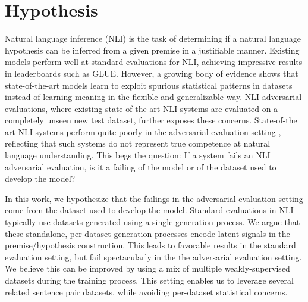 \section{Hypothesis}
\label{sec:hypothesis}


Natural language inference (NLI) is the task of determining if a natural language hypothesis can be inferred from a given premise in a justifiable manner. Existing models perform well at standard evaluations for NLI, achieving impressive results in leaderboards such as GLUE. However, a growing body of evidence \cite{mccoy2019right, glockner2018breaking} shows that state-of-the-art models learn to exploit spurious statistical patterns in datasets instead of learning meaning in the flexible and generalizable way. NLI adversarial evaluations, where existing state-of-the art NLI systems are evaluated on a completely unseen new test dataset, further exposes these concerns. State-of-the art NLI systems perform quite poorly in the adversarial evaluation setting \cite{nie2019adversarial}, reflecting that such systems do not represent true competence at natural language understanding. This begs the question: If a system fails an NLI adversarial evaluation, is it a failing of the model or of the dataset used to develop the model?

In this work, we hypothesize that the failings in the adversarial evaluation setting come from the dataset used to develop the model. Standard evaluations in NLI typically use datasets generated using a single generation process. We argue that these standalone, per-dataset generation processes encode latent signals in the premise/hypothesis construction. This leads to favorable results in the standard evaluation setting, but fail spectacularly in the the adversarial evaluation setting. We believe this can be improved by using a mix of multiple weakly-supervised datasets during the training process. This setting enables us to leverage several related sentence pair datasets, while avoiding per-dataset statistical concerns.


  




